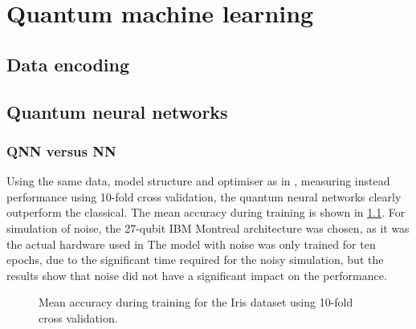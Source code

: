 \chapter{Quantum machine learning}

\section{Data encoding}

\section{Quantum neural networks}

\subsection{QNN versus NN}
Using the same data, model structure and optimiser as in \cite{abbas2021}, measuring instead performance using 10-fold cross validation, the quantum neural networks clearly outperform the classical. The mean accuracy during training is shown in \cref{fig:iris_training}. For simulation of noise, the 27-qubit IBM Montreal architecture was chosen, as it was the actual hardware used in \cite{abbas2021} The model with noise was only trained for ten epochs, due to the significant time required for the noisy simulation, but the results show that noise did not have a significant impact on the performance.

\begin{figure}
    \centering
    \caption{Mean accuracy during training for the Iris dataset using 10-fold cross validation.}
    \label{fig:iris_training}
\end{figure}

